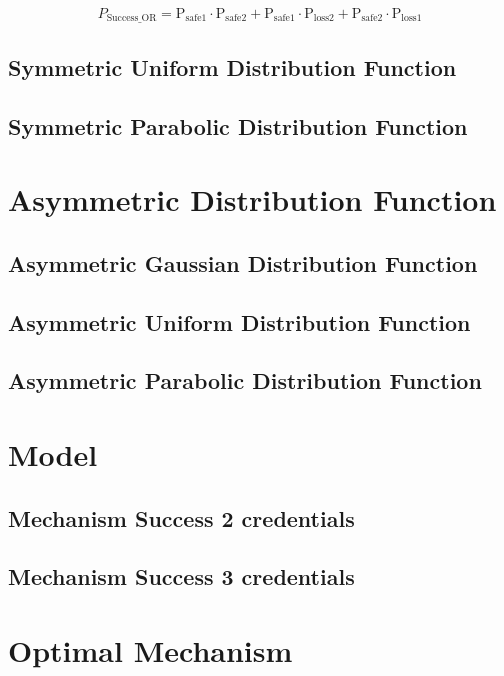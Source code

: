 \documentclass{article}
\begin{document}
\[
P_{\text{Success\_OR}} = \mathrm{P_{\text{safe1}}} \cdot \mathrm{P_{\text{safe2}}} + \mathrm{P_{\text{safe1}}} \cdot \mathrm{P_{\text{loss2}}} + \mathrm{P_{\text{safe2}}} \cdot \mathrm{P_{\text{loss1}}}
\]
\subsection{Symmetric Uniform Distribution Function}
\subsection{Symmetric Parabolic Distribution Function}
\section{Asymmetric Distribution Function}
\subsection{Asymmetric Gaussian Distribution Function}
\subsection{Asymmetric Uniform Distribution Function}
\subsection{Asymmetric Parabolic Distribution Function}
\section{Model}
\subsection{Mechanism Success 2 credentials}
\subsection{Mechanism Success 3 credentials}
\section{Optimal Mechanism}
\end{document}
